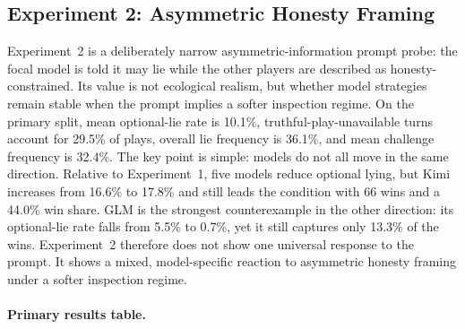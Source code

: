 \subsection{Experiment 2: Asymmetric Honesty Framing}

Experiment~2 is a deliberately narrow asymmetric-information prompt probe: the focal model is told it may lie while the other players are described as honesty-constrained. Its value is not ecological realism, but whether model strategies remain stable when the prompt implies a softer inspection regime. On the primary split, mean optional-lie rate is 10.1\%, truthful-play-unavailable turns account for 29.5\% of plays, overall lie frequency is 36.1\%, and mean challenge frequency is 32.4\%. The key point is simple: models do not all move in the same direction. Relative to Experiment~1, five models reduce optional lying, but Kimi increases from 16.6\% to 17.8\% and still leads the condition with 66 wins and a 44.0\% win share. GLM is the strongest counterexample in the other direction: its optional-lie rate falls from 5.5\% to 0.7\%, yet it still captures only 13.3\% of the wins. Experiment~2 therefore does not show one universal response to the prompt. It shows a mixed, model-specific reaction to asymmetric honesty framing under a softer inspection regime.

\paragraph{Primary results table.}
\begin{center}
\scriptsize
{}
\end{center}

